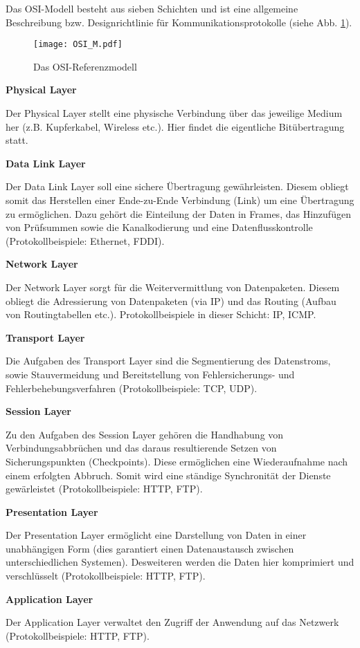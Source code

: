 Das OSI-Modell besteht aus sieben Schichten und ist eine allgemeine Beschreibung
bzw. Designrichtlinie f{\"u}r Kommunikationsprotokolle (siehe Abb.
\ref{fig:OSI_M}).

\begin{figure}[H]
\centering
\texttt{[image: OSI\_M.pdf]}
\caption{Das OSI-Referenzmodell}
\label{fig:OSI_M}
\end{figure}

\textbf{Physical Layer}

Der Physical Layer stellt eine physische Verbindung {\"u}ber das jeweilige
Medium her (z.B. Kupferkabel, Wireless etc.). Hier findet die eigentliche
Bit{\"u}bertragung statt.

\textbf{Data Link Layer}

Der Data Link Layer soll eine sichere {\"U}bertragung gew{\"a}hrleisten. Diesem
obliegt somit das Herstellen einer Ende-zu-Ende Verbindung (Link) um eine
{\"U}bertragung zu erm{\"o}glichen. Dazu geh{\"o}rt die Einteilung der Daten in
Frames, das Hinzuf{\"u}gen von Pr{\"u}fsummen sowie die Kanalkodierung und eine
Datenflusskontrolle (Protokollbeispiele: Ethernet, FDDI).

\textbf{Network Layer}

Der Network Layer sorgt f{\"u}r die Weitervermittlung von Datenpaketen. Diesem
obliegt die Adressierung von Datenpaketen (via \gls{IP}) und das Routing (Aufbau
von Routingtabellen etc.). Protokollbeispiele in dieser Schicht: \gls{IP}, ICMP.

\textbf{Transport Layer}

Die Aufgaben des Transport Layer sind die Segmentierung des Datenstroms, sowie
Stauvermeidung und Bereitstellung von Fehlersicherungs- und
Fehlerbehebungsverfahren (Protokollbeispiele: \gls{TCP}, \gls{UDP}).

\textbf{Session Layer}

Zu den Aufgaben des Session Layer geh{\"o}ren die Handhabung von
Verbindungsabbr{\"u}chen und das daraus resultierende Setzen von
Sicherungspunkten (Checkpoints). Diese erm{\"o}glichen eine Wiederaufnahme
nach einem erfolgten Abbruch. Somit wird eine st{\"a}ndige Synchronit{\"a}t der
Dienste gew{\"a}rleistet (Protokollbeispiele: HTTP, FTP).

\textbf{Presentation Layer}

Der Presentation Layer erm{\"o}glicht eine Darstellung von Daten in
einer unabh{\"a}ngigen Form (dies garantiert einen Datenaustausch zwischen
unterschiedlichen Systemen). Desweiteren werden die Daten hier komprimiert und
verschl{\"u}sselt (Protokollbeispiele: HTTP, FTP).

\textbf{Application Layer}

Der Application Layer verwaltet den Zugriff der Anwendung auf das Netzwerk
(Protokollbeispiele: HTTP, FTP).
